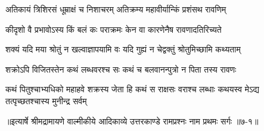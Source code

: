 \twolineshloka
{अतिकायं त्रिशिरसं धूम्राक्षं च निशाचरम्}
{अतिक्रम्य महावीर्यान्किं प्रशंसथ रावणिम्} %

\twolineshloka
{कीदृशो वै प्रभावोऽस्य किं बलं कः पराक्रमः}
{केन वा कारणेनैष रावणादतिरिच्यते} %

\twolineshloka
{शक्यं यदि मया श्रोतुं न खल्वाज्ञापयामि वः}
{यदि गुह्यं न चेद्वक्तुं श्रोतुमिच्छामि कथ्यताम्} %

\twolineshloka
{शक्रोऽपि विजितस्तेन कथं लब्धवरश्च सः}
{कथं च बलवानन्पुत्रो न पिता तस्य रावणः} %

\twolineshloka
{कथं पितुश्चाभ्यधिको महाहवे शक्रस्य जेता हि कथं स राक्षसः}
{वराश्च लब्धाः कथयस्व मेऽद्य तत्पृच्छतश्चास्य मुनीन्द्र सर्वम्} %


॥इत्यार्षे श्रीमद्रामायणे वाल्मीकीये आदिकाव्ये उत्तरकाण्डे रामप्रश्नः नाम प्रथमः सर्गः ॥७-१॥
